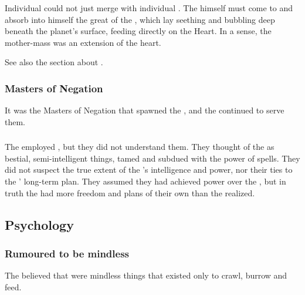 Individual \banes could not just merge with individual \noggyaleth.
The \baneking himself must come to \Miith and absorb into himself the great  of the \noggyaleth, which lay seething and bubbling deep beneath the planet's surface, feeding directly on the Heart.
In a sense, the \noggyal mother-mass was an extension of the heart.

See also the section about . 





\subsubsection{Masters of Negation}
It was the Masters of Negation that spawned the \noggyaleth, and the \noggyaleth continued to serve them. 






\subsubsection{\Resphain}
The \resphain employed \noggyaleth, but they did not understand them.
They thought of the \noggyaleth as bestial, semi-intelligent things, tamed and subdued with the power of spells.
They did not suspect the true extent of the \noggyaleth's intelligence and power, nor their ties to the \banelords' long-term plan.
They assumed they had achieved power over the \noggyaleth, but in truth the \noggyaleth had more freedom and plans of their own than the \resphain realized.









\subsection{Psychology}





\subsubsection{Rumoured to be mindless}
The \resphain believed that \noggyaleth were mindless things that existed only to crawl, burrow and feed.

